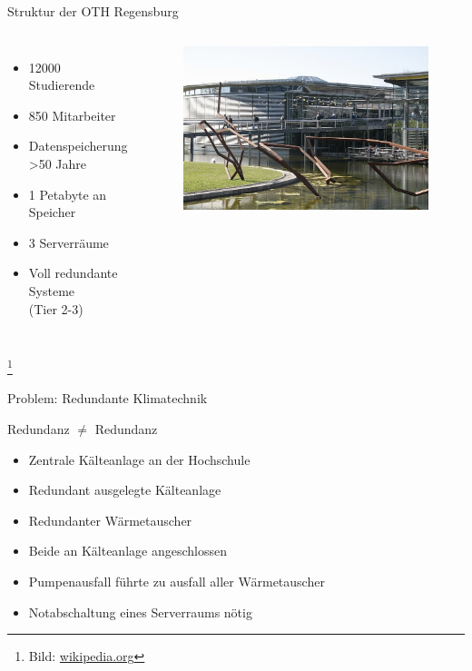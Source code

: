\documentclass[10pt]{beamer}
\newcommand\blfootnote[1]{%
	\begingroup
	\renewcommand\thefootnote{}\footnote{#1}%
	\addtocounter{footnote}{-1}%
	\endgroup
}
\begin{document}
%
%
\begin{frame}[fragile]{Struktur der OTH Regensburg}
\begin{columns}[T,c,onlytextwidth]
	\begin{itemize}
		\item 12000 Studierende
		\item 850 Mitarbeiter
		\item Datenspeicherung \textgreater 50 Jahre
		\item 1 Petabyte an Speicher
		\item 3 Serverräume
		\item Voll redundante Systeme \\(Tier 2-3)
	\end{itemize}
	\begin{figure}
		\includegraphics[width=1\textwidth]{images/oth}
	\end{figure}
\end{columns}

\blfootnote{Bild: \href{https://de.wikipedia.org/wiki/Datei:OTH_Regensburg_01.jpg}{wikipedia.org}}
\end{frame}

%
%
\begin{frame}[fragile]{Problem: Redundante Klimatechnik}
\begin{alertblock}{Redundanz $\neq$ Redundanz}
\end{alertblock}
\begin{itemize}
	\item Zentrale Kälteanlage an der Hochschule
	\item Redundant ausgelegte Kälteanlage
	\item Redundanter Wärmetauscher
	\item Beide an Kälteanlage angeschlossen
	\item Pumpenausfall führte zu ausfall aller Wärmetauscher
	\item Notabschaltung eines Serverraums nötig
\end{itemize}
\end{frame}
\end{document}

